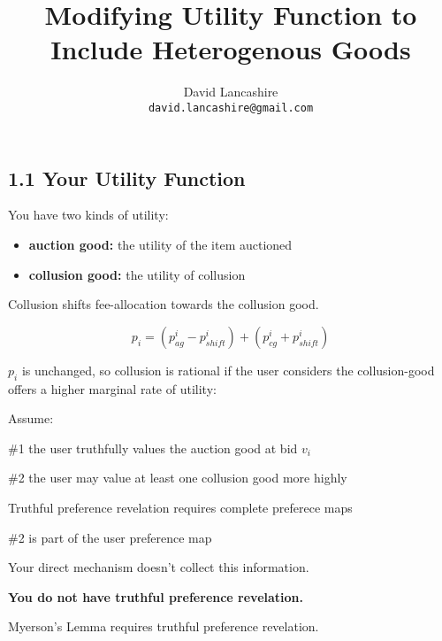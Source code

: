 \documentclass[oneside]{article}   	%
\title{Modifying Utility Function to Include Heterogenous Goods}
\author{
  David Lancashire\\
  \texttt{david.lancashire@gmail.com}\\
}
\begin{document}
\maketitle 

\subsection*{1.1 Your Utility Function}
\vspace{0.5em}

You have two kinds of utility:

\begin{itemize}
  \item \textbf{auction good:} the utility of the item auctioned
  \item \textbf{collusion good:} the utility of collusion
\end{itemize}
\vspace{0.5em}

Collusion shifts fee-allocation towards the collusion good.

$$
p_i = \left( p_{ag}^i - p_{shift}^i \right) + \left( p_{cg}^i + p_{shift}^i \right)
$$

$p_i$ is unchanged, so collusion is rational if the user considers the collusion-good offers a higher marginal rate of utility:


Assume:

\#1 the user truthfully values the auction good at bid $v_{i}$

\#2 the user may value at least one collusion good more highly

Truthful preference revelation requires complete preferece maps

\#2 is part of the user preference map

Your direct mechanism doesn't collect this information.

\textbf{You do not have truthful preference revelation.}

Myerson's Lemma requires truthful preference revelation.

\pagebreak
\end{document}
